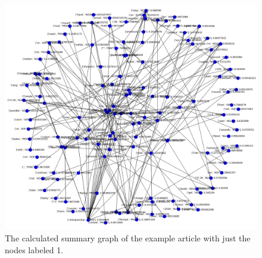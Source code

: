 \begin{figure}[!ht]
	\centering
	\includegraphics[width=150mm, keepaspectratio]{figures/usain_bolt_predicted_attended.png}
	\caption{The calculated summary graph of the example article with just the nodes labeled 1.}
	\label{fig:usain_bolt_predicted1}
\end{figure}

\FloatBarrier

